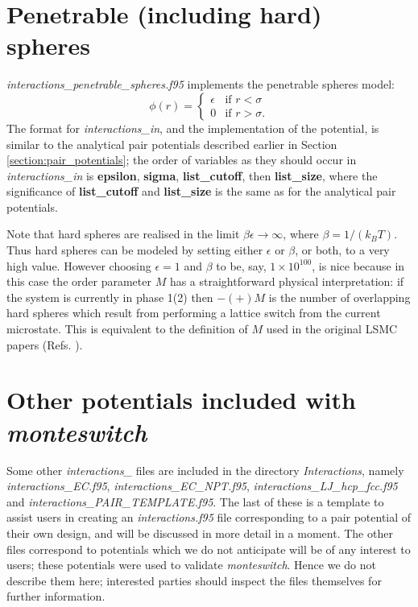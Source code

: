 \documentclass{report}
\begin{document}
\section{Penetrable (including hard) spheres}
\emph{interactions\_penetrable\_spheres.f95} implements the penetrable spheres model:
\begin{equation}
\phi(r)=
\begin{cases} 
\epsilon & \text{if }r<\sigma \\
0 & \text{if }r>\sigma.
\end{cases}
\end{equation}
The format for \emph{interactions\_in}, and the implementation of the potential, is similar to the analytical pair potentials 
described earlier in Section \ref{section:pair_potentials}; the order of variables as they should occur in \emph{interactions\_in} 
is \textbf{epsilon}, \textbf{sigma}, \textbf{list\_cutoff}, then \textbf{list\_size}, where the significance of 
\textbf{list\_cutoff} and \textbf{list\_size} is the same as for the analytical pair potentials.

Note that hard spheres are realised in the limit $\beta\epsilon\to\infty$, where $\beta=1/(k_BT)$. Thus hard spheres can be modeled by 
setting either $\epsilon$ or $\beta$, or both, to a very high value. However choosing $\epsilon=1$ and $\beta$ to be, say, 
$1\times 10^{100}$, is nice because in this case the order parameter $M$ has a straightforward physical interpretation: if the system is
currently in phase 1(2) then $-(+)M$ is the number of overlapping hard spheres which result from performing a lattice switch from the 
current microstate. This is equivalent to the definition of $M$ used in the original LSMC papers (Refs. \cite{Bruce_1997,Bruce_2000}).


\section{Other potentials included with \emph{monteswitch}}
Some other \emph{interactions\_} files are included in the directory \emph{Interactions}, namely \emph{interactions\_EC.f95}, 
\emph{interactions\_EC\_NPT.f95}, \emph{interactions\_LJ\_hcp\_fcc.f95} and \emph{interactions\_PAIR\_TEMPLATE.f95}. The last of
these is a template to assist users in creating an \emph{interactions.f95} file corresponding to a pair potential of their own
design, and will be discussed in more detail in a moment. The other files correspond to potentials which we do not anticipate will
be of any interest to users; these potentials were used to validate \emph{monteswitch}. Hence we do not describe them here;
interested parties should inspect the files themselves for further information.
\end{document}
